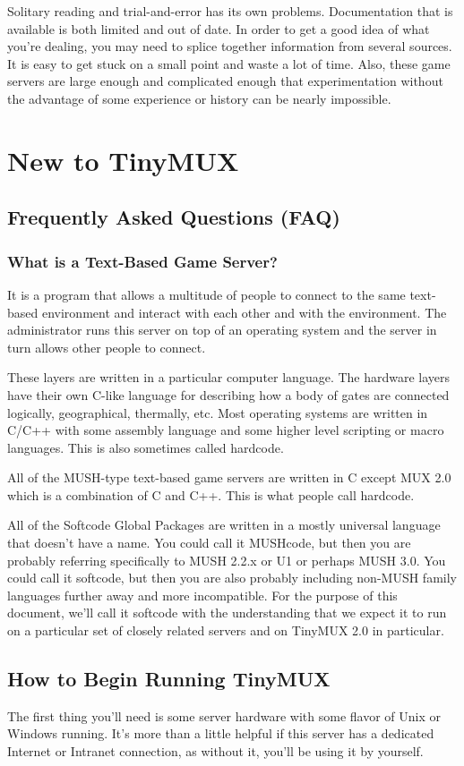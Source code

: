 \documentclass[letterpaper]{book}
\begin{document}
Solitary reading and trial-and-error has its own problems. Documentation that
is available is both limited and out of date. In order to get a good idea of
what you're dealing, you may need to splice together information from several
sources. It is easy to get stuck on a small point and waste a lot of time.
Also, these game servers are large enough and complicated enough that
experimentation without the advantage of some experience or history can be
nearly impossible.
\chapter{New to TinyMUX}
\section{Frequently Asked Questions (FAQ)}
\subsection{What is a Text-Based Game Server?}
It is a program that allows a multitude of people to connect to the same
text-based environment and interact with each other and with the environment.
The administrator runs this server on top of an operating system and the server
in turn allows other people to connect. %

These layers are written in a particular computer language. The hardware
layers have their own C-like language for describing how a body of gates are
connected logically, geographical, thermally, etc.  Most operating systems are
written in C/C++ with some assembly language and some higher level scripting
or macro languages. This is also sometimes called hardcode.

All of the MUSH-type text-based game servers are written in C except MUX 2.0
which is a combination of C and C++. This is what people call hardcode.

All of the Softcode Global Packages are written in a mostly universal language
that doesn't have a name. You could call it MUSHcode, but then you are probably
referring specifically to MUSH 2.2.x or U1 or perhaps MUSH 3.0. You could call
it softcode, but then you are also probably including non-MUSH family languages
further away and more incompatible. For the purpose of this document, we'll
call it softcode with the understanding that we expect it to run on a particular
set of closely related servers and on TinyMUX 2.0 in particular.

\section{How to Begin Running TinyMUX}
The first thing you'll need is some server hardware with some flavor of Unix or
Windows running. It's more than a little helpful if this server has a dedicated
Internet or Intranet connection, as without it, you'll be using it by yourself.
\end{document}
